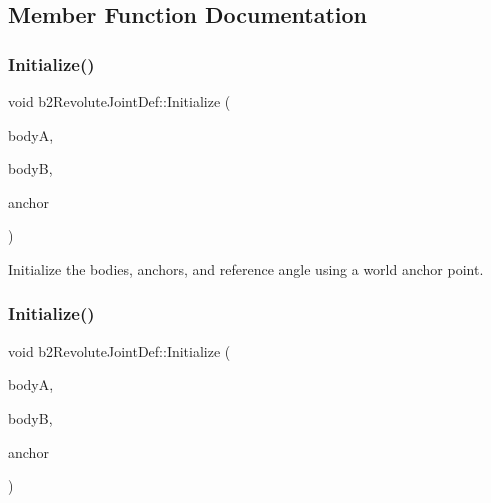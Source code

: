 \subsection{Member Function Documentation}
\mbox{\label{structb2RevoluteJointDef_a6401b2a663533415d032a525e4fa2806}} 
\subsubsection{\texorpdfstring{Initialize()}{Initialize()}\hspace{0.1cm}{\footnotesize\ttfamily [1/2]}}
{\footnotesize\ttfamily void b2\+Revolute\+Joint\+Def\+::\+Initialize (\begin{DoxyParamCaption}\item[{\hyperlink{classb2Body}{b2\+Body} $\ast$}]{bodyA,  }\item[{\hyperlink{classb2Body}{b2\+Body} $\ast$}]{bodyB,  }\item[{const \hyperlink{structb2Vec2}{b2\+Vec2} \&}]{anchor }\end{DoxyParamCaption})}

Initialize the bodies, anchors, and reference angle using a world anchor point. \mbox{\label{structb2RevoluteJointDef_a6401b2a663533415d032a525e4fa2806}} 
\subsubsection{\texorpdfstring{Initialize()}{Initialize()}\hspace{0.1cm}{\footnotesize\ttfamily [2/2]}}
{\footnotesize\ttfamily void b2\+Revolute\+Joint\+Def\+::\+Initialize (\begin{DoxyParamCaption}\item[{\hyperlink{classb2Body}{b2\+Body} $\ast$}]{bodyA,  }\item[{\hyperlink{classb2Body}{b2\+Body} $\ast$}]{bodyB,  }\item[{const \hyperlink{structb2Vec2}{b2\+Vec2} \&}]{anchor }\end{DoxyParamCaption})}

